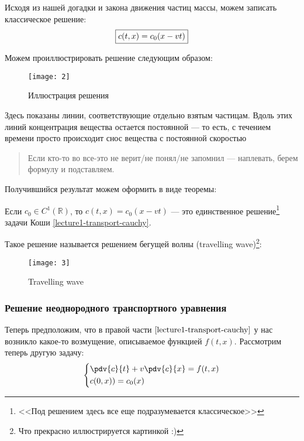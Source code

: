 Исходя из нашей догадки и закона движения частиц массы, можем записать классическое решение:
%
\begin{equation}
  \boxed{%
    c(t, x) = c_0(x - vt)}
  \label{lecture1-travelling-wave}
\end{equation}

Можем проиллюстрировать решение следующим образом:

\begin{figure}[ht]
  \centering
  \texttt{[image: 2]}
  \caption{Иллюстрация решения}
\end{figure}
%
Здесь показаны линии, соответствующие отдельно взятым частицам. Вдоль этих линий концентрация вещества остается постоянной --- то есть, с течением времени просто происходит снос вещества с постоянной скоростью

\begin{quote}
  Если кто-то во все-это не верит/не понял/не запомнил --- наплевать, берем формулу и подставляем.
\end{quote}

Получившийся результат можем оформить в виде теоремы:
%
\begin{thm}
  Если $c_0 \in C^1(\mathbb{R})$, то $c(t, x) = c_0(x - vt)$ --- это единственное решение\footnote{<<Под решением здесь все еще подразумевается классическое>>} задачи Коши \eqref{lecture1-transport-cauchy}.
\end{thm}

Такое решение называется решением бегущей волны (travelling wave)\footnote{Что прекрасно иллюстрируется картинкой :)}:
%
\begin{figure}[ht]
  \centering
  \texttt{[image: 3]}
  \caption{Travelling wave}
\end{figure}

\subsubsection{Решение неоднородного транспортного уравнения}

Теперь предположим, что в правой части $\eqref{lecture1-transport-cauchy}$ у нас возникло какое-то возмущение, описываемое функцией $f(t, x)$. Рассмотрим теперь другую задачу:
%
\begin{equation}
  \left\{\begin{aligned}
    &\pdv{c}{t} + v \pdv{c}{x} = f(t, x) \\
    &c(0, x)) = c_0(x)
  \end{aligned}\right.
  \label{lecture1-transport-nonhom}
\end{equation}

